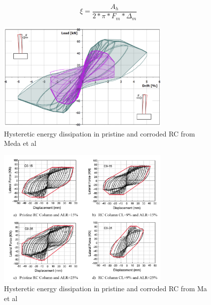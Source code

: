 \begin{equation}
    \xi=\frac{A_h}{2*\pi*F_m*\Delta_m}
    \label{eq:JacobsenEquation}
\end{equation}

\begin{figure}[htbp]
	\centering
    \includegraphics[width=0.75\textwidth]{VAC Prelim 2.0/Chapter-5/figs/Meda_HystereticArea_01.png}
	\caption{Hysteretic energy dissipation in pristine and corroded RC from Meda et al \cite{Meda2014}}
	\label{fig:DDBD_sum}
\end{figure}

\begin{figure}[htbp]
	\centering
    \includegraphics[width=0.75\textwidth]{VAC Prelim 2.0/Chapter-5/figs/Ma_HystereticArea_01.png}
	\caption{Hysteretic energy dissipation in pristine and corroded RC from Ma et al \cite{Meda2014}}
	\label{fig:DDBD_sum}
\end{figure}

